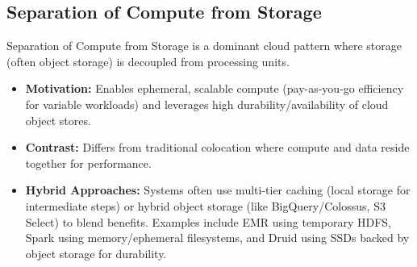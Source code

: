 \subsection*{Separation of Compute from Storage}
Separation of Compute from Storage is a dominant cloud pattern where
storage (often object storage) is decoupled from processing units.
\begin{itemize}
    \item \textbf{Motivation:} Enables ephemeral, scalable compute
    (pay-as-you-go efficiency for variable workloads) and leverages
    high durability/availability of cloud object stores.

    \item \textbf{Contrast:} Differs from traditional colocation
    where compute and data reside together for performance.

    \item \textbf{Hybrid Approaches:} Systems often use multi-tier
    caching (local storage for intermediate steps) or hybrid object
    storage (like BigQuery/Colossus, S3 Select) to blend benefits.
    Examples include EMR using temporary HDFS, Spark using
    memory/ephemeral filesystems, and Druid using SSDs backed by
    object storage for durability.
\end{itemize}


